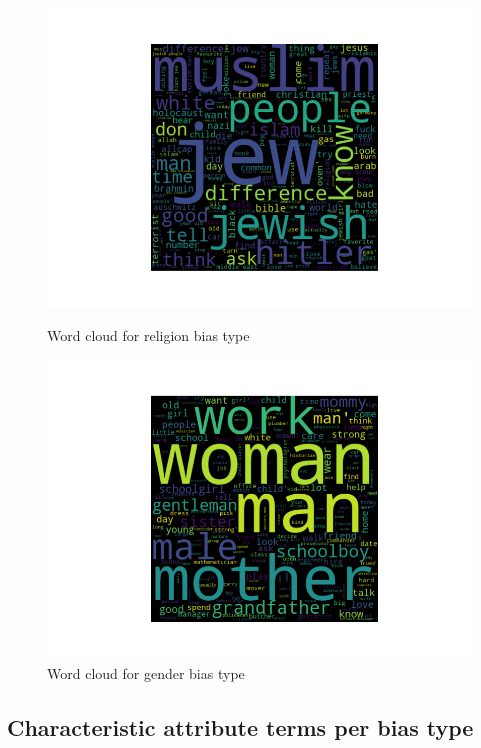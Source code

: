 \begin{figure}
\centering
\begin{minipage}{.5\textwidth}
  \centering
    \includegraphics[width=1\textwidth]{thesis/figures/religion.png}
    \caption{Word cloud for religion bias type}
  \label{fig:test1}
\end{minipage}%
\begin{minipage}{.5\textwidth}
  \centering
    \includegraphics[width=1\textwidth]{thesis/figures/gender.png}
    \caption{Word cloud  for gender bias type}
  \label{fig:test2}
\end{minipage}
\end{figure}

\pagebreak
\subsection{Characteristic attribute terms per bias type}



